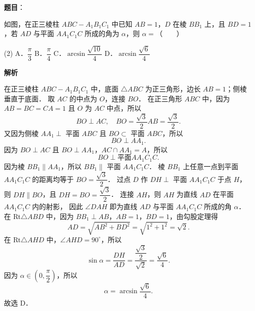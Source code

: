 \begin{answer}

\textbf{题目}：

如图，在正三棱柱 $ABC - A_1B_1C_1$ 中已知 $AB = 1$，$D$ 在棱 $BB_1$ 上，且 $BD = 1$，若 $AD$ 与平面 $AA_1C_1C$ 所成的角为 $\alpha$，则 $\alpha =$\mbox{（　　）}
\nopagebreak[4]
\begin{center}\end{center}
\nopagebreak[4]
\begin{gkopts}(2)
\task A．$\dfrac{\pi}{3}$
\task B．$\dfrac{\pi}{4}$
\task C．$\arcsin\dfrac{\sqrt{10}}{4}$
\task D．$\arcsin\dfrac{\sqrt{6}}{4}$
\end{gkopts}

\textbf{解析}
\nopagebreak[4]
\begin{center}\end{center}
\nopagebreak[4]
在正三棱柱 $ABC - A_1B_1C_1$ 中，底面 $\triangle ABC$ 为正三角形，边长 $AB = 1$；侧棱垂直于底面．
取 $AC$ 的中点为 $O$，连接 $BO$．
在正三角形 $ABC$ 中，因为 $AB = BC = CA = 1$ 且 $O$ 为 $AC$ 中点，所以
\nopagebreak[4]
\[
BO \perp AC, \quad BO = \frac{\sqrt{3}}{2}AB = \frac{\sqrt{3}}{2}.
\]
又因为侧棱 $AA_1 \perp$ 平面 $ABC$ 且 $BO \subset$ 平面 $ABC$，所以
\nopagebreak[4]
\[
BO \perp AA_1.
\]
因为 $BO \perp AC$ 且 $BO \perp AA_1$，$AC \cap AA_1 = A$，所以
\nopagebreak[4]
\[
BO \perp \text{平面} AA_1C_1C.
\]
因为棱 $BB_1 \parallel AA_1$，所以 $BB_1 \parallel$ 平面 $AA_1C_1C$．
棱 $BB_1$ 上任意一点到平面 $AA_1C_1C$ 的距离均等于 $BO = \dfrac{\sqrt{3}}{2}$．
过点 $D$ 作 $DH \perp$ 平面 $AA_1C_1C$ 于点 $H$，则 $DH \parallel BO$，且 $DH = BO = \dfrac{\sqrt{3}}{2}$．
连接 $AH$，则 $AH$ 为直线 $AD$ 在平面 $AA_1C_1C$ 内的射影，
因此 $\angle DAH$ 即为直线 $AD$ 与平面 $AA_1C_1C$ 所成的角 $\alpha$．
在 Rt$\triangle ABD$ 中，因为 $BB_1 \perp AB$，$AB = 1$，$BD = 1$，由勾股定理得
\nopagebreak[4]
\[
AD = \sqrt{AB^2 + BD^2} = \sqrt{1^2 + 1^2} = \sqrt{2}.
\]
在 Rt$\triangle AHD$ 中，$\angle AHD = 90^\circ$，所以
\nopagebreak[4]
\[
\sin\alpha = \frac{DH}{AD} = \frac{\dfrac{\sqrt{3}}{2}}{\sqrt{2}} = \frac{\sqrt{6}}{4}.
\]
因为 $\alpha \in \left(0, \dfrac{\pi}{2}\right)$，所以
\nopagebreak[4]
\[
\alpha = \arcsin\frac{\sqrt{6}}{4}.
\]
故选 D．


\end{answer}
